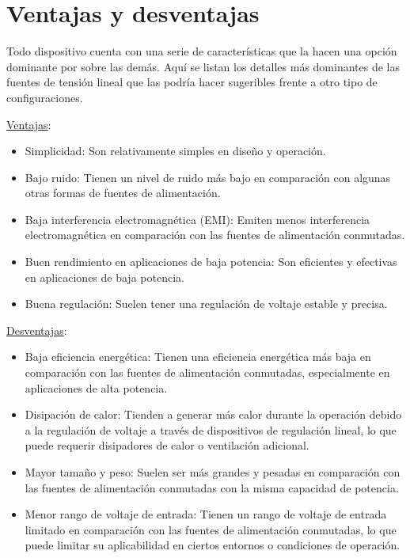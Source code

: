 \section{Ventajas y desventajas}\par 
Todo dispositivo cuenta con una serie de características que la hacen una opción dominante por sobre las demás. Aquí se listan los detalles más dominantes de las fuentes de tensión lineal que las podría hacer sugeribles frente a otro tipo de configuraciones.\par 
\underline{Ventajas}:
\begin{itemize}
    \item Simplicidad: Son relativamente simples en diseño y operación.
    \item Bajo ruido: Tienen un nivel de ruido más bajo en comparación con algunas otras formas de fuentes de alimentación.
    \item Baja interferencia electromagnética (EMI): Emiten menos interferencia electromagnética en comparación con las fuentes de alimentación conmutadas.
    \item Buen rendimiento en aplicaciones de baja potencia: Son eficientes y efectivas en aplicaciones de baja potencia.
    \item Buena regulación: Suelen tener una regulación de voltaje estable y precisa.
\end{itemize}\par 
\underline{Desventajas}:
\begin{itemize}
    \item Baja eficiencia energética: Tienen una eficiencia energética más baja en comparación con las fuentes de alimentación conmutadas, especialmente en aplicaciones de alta potencia.
    \item Disipación de calor: Tienden a generar más calor durante la operación debido a la regulación de voltaje a través de dispositivos de regulación lineal, lo que puede requerir disipadores de calor o ventilación adicional.
    \item Mayor tamaño y peso: Suelen ser más grandes y pesadas en comparación con las fuentes de alimentación conmutadas con la misma capacidad de potencia.
    \item Menor rango de voltaje de entrada: Tienen un rango de voltaje de entrada limitado en comparación con las fuentes de alimentación conmutadas, lo que puede limitar su aplicabilidad en ciertos entornos o condiciones de operación.
\end{itemize}

